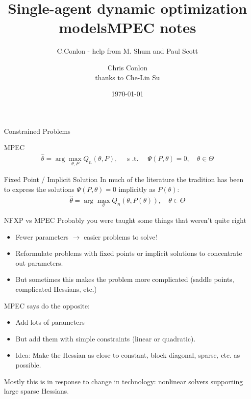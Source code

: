 \documentclass[xcolor=pdftex,dvipsnames,table,mathserif,aspectratio=169]{beamer}
\title [Single-agent dynamic optimization models]{Single-agent dynamic optimization models}
\author{C.Conlon - help from M. Shum and Paul Scott}
\institute{Grad IO }
\date{}
\begin{document}
\title{MPEC notes}
\author{Chris Conlon\\
 thanks to Che-Lin Su}
\date{\today}
\footnotesize
\frame{\titlepage}


\begin{frame}{Constrained Problems}
\begin{block}{MPEC}
\begin{align*}
\hat{\theta} = \arg \max_{\theta,P} Q_n(\theta,P), \quad  \mbox{ s .t. } \quad \Psi(P,\theta) =0,  \quad \theta \in \Theta
\end{align*} 
\end{block}
\pause
\begin{block}{Fixed Point / Implicit Solution}
In much of the literature the tradition has been to express the solutions $\Psi(P,\theta) =0$ implicitly as $P(\theta)$:
\begin{align*}
\hat{\theta} = \arg \max_{\theta} Q_n(\theta,P(\theta)),  \quad \theta \in \Theta
\end{align*}
\end{block}
\end{frame}

\begin{frame}{NFXP vs MPEC}
Probably you were taught some things that weren't quite right
\begin{itemize}
\item Fewer parameters $\rightarrow$ easier problems to solve!
\item Reformulate problems with fixed points or implicit solutions to \alert{concentrate out} parameters.
\item But sometimes this makes the problem more complicated (saddle points, complicated Hessians, etc.)
\end{itemize}
MPEC says do the opposite:
\begin{itemize}
\item Add lots of parameters
\item But add them with simple constraints (linear or quadratic).
\item Idea: Make the Hessian as close to constant, block diagonal, sparse, etc. as possible.
\end{itemize}
Mostly this is in response to change in technology: nonlinear solvers supporting large sparse Hessians.
\end{frame}
\end{document}

